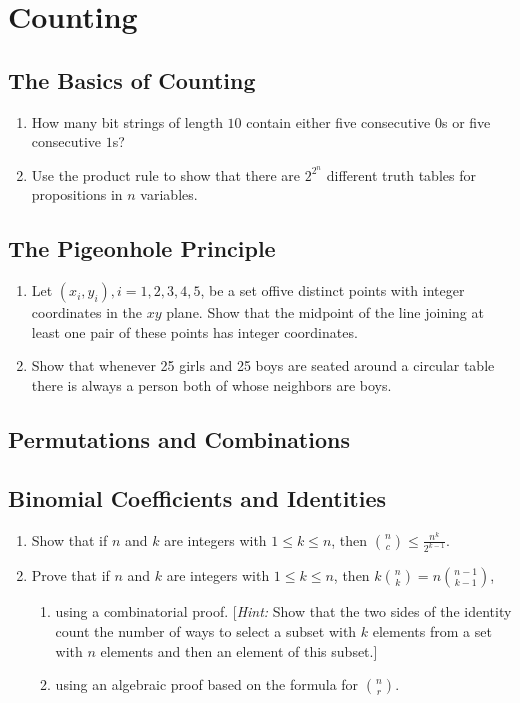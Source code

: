 \documentclass{sig-alternate-05-2015}
\begin{document}
\section{Counting}
\subsection{The Basics of Counting}
\begin{enumerate}
	\item How many bit strings of length $10$ contain either five consecutive
	$0$s or five consecutive $1$s?
	
	\item Use the product rule to show that there are $2^{2^n}$
	different truth tables for propositions in $n$ variables.

\end{enumerate}
\subsection{The Pigeonhole Principle}
\begin{enumerate}
	\item Let $(x_i, y_i), i = 1, 2, 3, 4, 5$, be a set offive distinct points with integer coordinates in the $xy$ plane. Show that the
	midpoint of the line joining at least one pair of these points has integer coordinates.
	
	\item Show that whenever 25 girls and 25 boys are seated around a circular table there is always a person both of whose neighbors are boys.
\end{enumerate}
\subsection{Permutations and Combinations}
\subsection{Binomial Coefficients and Identities}

\begin{enumerate}
	\item Show that if $n$ and $k$ are integers with $1 \le k \le n$, then $\binom{n}{c} \le \frac{n^k}{2^{k - 1}}$.
	
	\item Prove that if $n$ and $k$ are integers with $1 \le k \le n$, then $k \binom{n}{k} = n \binom{n - 1}{k - 1}$,\begin{enumerate}
		\item using a combinatorial proof. [\textit{Hint:} Show that the two sides of the identity count the number of ways to select a subset with $k$ elements from a set with $n$ elements and then an element of this subset.]
		\item using an algebraic proof based on the formula for $\binom{n}{r}$.
	\end{enumerate}
\end{enumerate}
\end{document}
